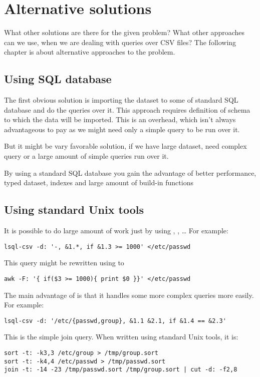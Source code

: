 
\chapter{Alternative solutions}
What other solutions are there for the given problem? What other approaches can we use, when we are dealing with queries over CSV files? 
The following chapter is about alternative approaches to the problem.

\section{Using SQL database}
The first obvious solution is importing the dataset to some of standard SQL database and do the queries over it. 
This approach requires definition of schema to which the data will be imported. This is an overhead, which isn't
always advantageous to pay as we might need only a simple query to be run over it.

But it might be vary favorable solution, if we have large dataset, need complex query or a large amount of simple queries run over it.

By using a standard SQL database you gain the advantage of better performance, typed dataset, indexes and large amount of build-in functions

\section{Using standard Unix tools}
It is possible to do large amount of work just by using , , \ldots
For example:

\begin{verbatim}
lsql-csv -d: '-, &1.*, if &1.3 >= 1000' </etc/passwd
\end{verbatim}

This query might be rewritten using  to
\begin{verbatim}
awk -F: '{ if($3 >= 1000){ print $0 }}' </etc/passwd
\end{verbatim}

The main advantage of  is that it handles some more complex queries more easily. For example:
\begin{verbatim}
lsql-csv -d: '/etc/{passwd,group}, &1.1 &2.1, if &1.4 == &2.3'
\end{verbatim}

This is the simple join query. When written using standard Unix tools, it is:
\begin{verbatim}
sort -t: -k3,3 /etc/group > /tmp/group.sort
sort -t: -k4,4 /etc/passwd > /tmp/passwd.sort
join -t: -14 -23 /tmp/passwd.sort /tmp/group.sort | cut -d: -f2,8 
\end{verbatim}

